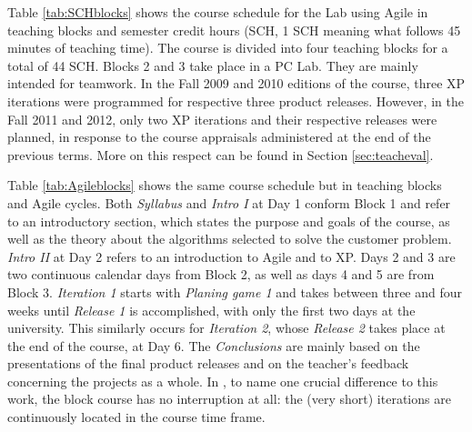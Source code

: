 \documentclass[conference]{IEEEtran}
\begin{document}
Table \ref{tab:SCHblocks} shows the course schedule for the Lab using Agile in teaching blocks and semester credit hours (SCH, 1 SCH meaning what follows 45 minutes of teaching time). The course is divided into four teaching blocks for a total of 44 SCH. Blocks 2 and 3 take place in a PC Lab. They are mainly intended for teamwork. In the Fall 2009 and 2010 editions of the course, three XP iterations were programmed for respective three product releases. However, in the Fall 2011 and 2012, only two XP iterations and their respective releases were planned, in response to the course appraisals administered at the end of the previous terms. More on this respect can be found in Section \ref{sec:teacheval}.

Table \ref{tab:Agileblocks} shows the same course schedule but in teaching blocks and Agile cycles. Both \textit{Syllabus} and \textit{Intro I} at Day 1 conform Block 1 and refer to an introductory section, which states the purpose and goals of the course, as well as the theory about the algorithms selected to solve the customer problem. \textit{Intro II} at Day 2 refers to an introduction to Agile and to XP. Days 2 and 3 are two continuous calendar days from Block 2, as well as days 4 and 5 are from Block 3. \textit{Iteration 1} starts with \textit{Planing game 1} and takes between three and four weeks until \textit{Release 1} is accomplished, with only the first two days at the university. This similarly occurs for \textit{Iteration 2}, whose \textit{Release 2} takes place at the end of the course, at Day 6. The \textit{Conclusions} are mainly based on the presentations of the final product releases and on the teacher's feedback concerning the projects as a whole. In \cite{StLuEr08}, to name one crucial difference to this work, the block course has no interruption at all: the (very short) iterations are continuously located in the course time frame.
\end{document}
